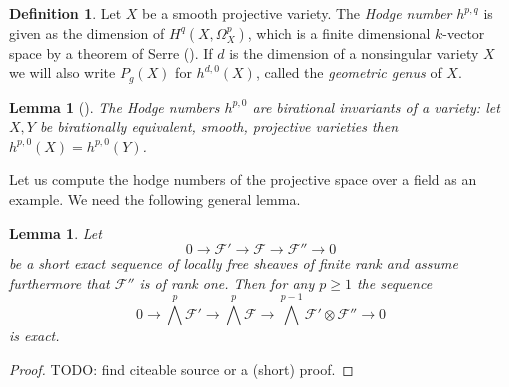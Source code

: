 \documentclass[11pt, a4paper, german, twoside]{article}
\theoremstyle{plain}
\newtheorem{lemma}[theorem]{Lemma}
\theoremstyle{definition}
\newtheorem{definition}[theorem]{Definition}
\begin{document}
\begin{definition}
    Let $X$ be a smooth projective variety. The \emph{Hodge number} $h^{p,q}$ is given as the dimension of $H^q(X,\Omega^p_X)$, 
    which is a finite dimensional $k$-vector space by a theorem of Serre (\cite[§3 Prop. 7]{FAC}).
    If $d$ is the dimension of a nonsingular variety $X$ we will also write $P_g(X)$ for $h^{d,0}(X)$, called the \emph{geometric genus} of $X$.
\end{definition}


\begin{lemma}[{\cite[II Ex. 8.8]{Ha}}]
    \label{bir}
    The Hodge numbers $h^{p,0}$ are birational invariants of a variety: let $X, Y$ be birationally equivalent, smooth, projective varieties
    then $h^{p,0}(X) = h^{p,0}(Y)$.
\end{lemma}

Let us compute the hodge numbers of the projective space over a field as an example.
We need the following general lemma.

\begin{lemma}
    \label{ses}
    Let 
    \[
        0 \to \mathcal{F}' \to \mathcal{F} \to \mathcal{F}'' \to 0
    \]
    be a short exact sequence of locally free sheaves of finite rank and assume furthermore that $\mathcal{F}''$ is of rank one.
    Then for any $p \ge 1$ the sequence
    \[
        0 \to {\bigwedge}^p \mathcal{F}' \to {\bigwedge}^p \mathcal{F} \to {\bigwedge}^{p-1} \mathcal{F}' \otimes \mathcal{F}'' \to 0
    \]
    is exact.
\end{lemma}
\begin{proof}
    TODO: find citeable source or a (short) proof.
\end{proof}
\end{document}
